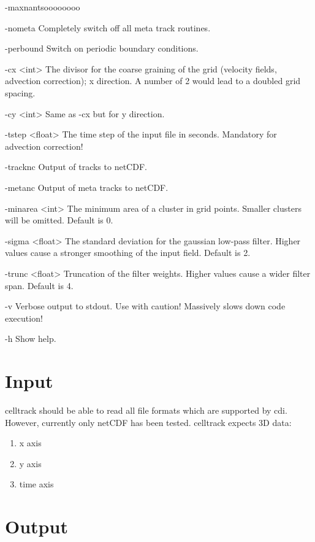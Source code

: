 \documentclass{scrartcl}
\begin{document}
\begin{labeling}{-maxnantsoooooooo}
    \item[-nometa] Completely switch off all meta track routines.
    \item[-perbound] Switch on periodic boundary conditions.
    \item[-cx \textless int\textgreater] The divisor for the coarse graining of the grid (velocity fields, advection correction); x direction. A number of 2 would lead to a doubled grid spacing. 
    \item[-cy \textless int\textgreater] Same as -cx but for y direction.
    \item[-tstep \textless float\textgreater] The time step of the input file in seconds. Mandatory for advection correction!
    \item[-tracknc] Output of tracks to netCDF.
    \item[-metanc] Output of meta tracks to netCDF.
    \item[-minarea \textless int\textgreater] The minimum area of a cluster in grid points. Smaller clusters will be omitted. Default is 0.
    \item[-sigma \textless float\textgreater] The standard deviation for the gaussian low-pass filter. Higher values cause a stronger smoothing of the input field. Default is 2.
    \item[-trunc \textless float\textgreater] Truncation of the filter weights. Higher values cause a wider filter span. Default is 4.
	\item[-v] Verbose output to stdout. Use with caution! Massively slows down code execution!
	\item[-h] Show help.
\end{labeling}

\section{Input}
celltrack should be able to read all file formats which are supported by cdi. However, currently only netCDF has been tested.
celltrack expects 3D data:
\begin{enumerate}
	\item x axis
	\item y axis
    \item time axis
\end{enumerate}

\section{Output}
\label{sec:output}
\end{document}
